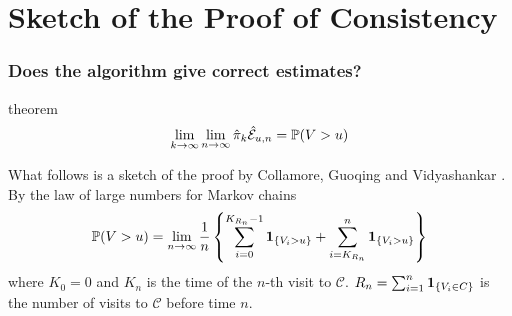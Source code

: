 \documentclass{beamer}
\begin{document}
\section{Sketch of the Proof of Consistency}


\begin{frame}
  \frametitle{Does the algorithm give correct estimates?}
  \begin{exampleblock}{theorem}
  \[
  \lim_{k \to \infty} \lim_{n \to \infty} \hat{\pi}_k \hat{\mathcal
    E}_{u,n} = \P(V > u)
  \]
  \end{exampleblock}
  What follows is a sketch of the proof by Collamore, Guoqing and
  Vidyashankar \cite{collamore2014}. By the law of large numbers for
  Markov chains
  \[
  \P(V > u) = \lim_{n \to \infty} {1 \over n} \left\{
  \sum_{i=0}^{K_{R_n} - 1} \1{V_i > u}
  +
  \sum_{i=K_{R_n}}^{n} \1{V_i > u}
  \right\}
  \]
  where $K_0 = 0$ and $K_n$ is the time of the $n$-th visit to
  $\mathcal C$. $R_n = \sum_{i=1}^n \1{V_i \in C}$ is the number of
  visits to $\mathcal C$ before time $n$.
\end{frame}
\end{document}

